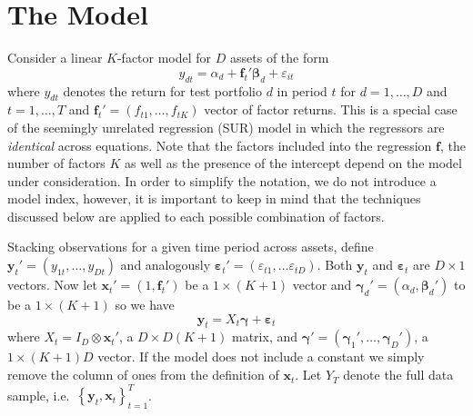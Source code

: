\section{The Model}
Consider a linear $K$-factor model for $D$ assets of the form
\begin{equation*}
y_{dt}=\alpha _{d} + \mathbf{f}_{t}' \boldsymbol{\beta}_d + \varepsilon_{it}
\end{equation*}
where $y_{dt}$ denotes the return for test portfolio $d$ in period $t$ for $d = 1, \hdots, D$ and $t = 1, \hdots, T$ and $\mathbf{f}_{t}'=\left(f_{t1}, \hdots,f_{tK}\right)$ vector of factor returns.
This is a special case of the seemingly unrelated regression (SUR) model in which the regressors are \emph{identical} across equations.
Note that the factors included into the regression $\mathbf{f}$, the number of factors $K$ as well as the presence of the intercept depend on the model under consideration.  
In order to simplify the notation, we do not introduce a model index, however, it is important to keep in mind that the techniques discussed below are applied to each possible combination of factors.

Stacking observations for a given time period across assets, define $\mathbf{y}_t' = (y_{1t}, \hdots, y_{Dt})$ and analogously $\boldsymbol{\varepsilon}_t' = \left( \varepsilon_{t1}, \hdots \varepsilon_{tD} \right)$. 
Both $\mathbf{y}_t$ and $\boldsymbol{\varepsilon}_t$ are $D \times 1$ vectors.
Now let $\mathbf{x}_t' = (1, \mathbf{f}_t')$ be a $1 \times (K+1)$ vector and $\boldsymbol{\gamma}_d' = (\alpha_d, \boldsymbol{\beta}_d')$ to be a $1 \times (K+1)$ so we have
\begin{equation*}
\mathbf{y}_t = X_t \boldsymbol{\gamma} + \boldsymbol{\varepsilon}_t
\end{equation*}
where $X_t = I_D \otimes \mathbf{x}_t'$, a $D \times D(K+1)$ matrix, and $\boldsymbol{\gamma}'= \left( \boldsymbol{\gamma}_1', \hdots, \boldsymbol{\gamma}_D' \right)$, a $1 \times (K+1)D$ vector. 
If the model does not include a constant we simply remove the column of ones from the definition of $\mathbf{x}_t$.
Let $Y_T$ denote the full data sample, i.e.\ $\left\{ \mathbf{y}_t, \mathbf{x}_t \right\}_{t=1}^T$.


